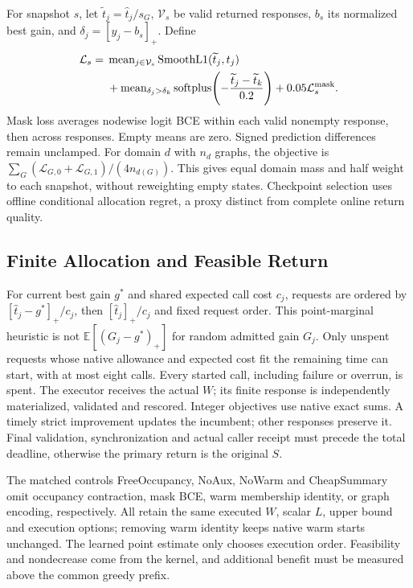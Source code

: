 For snapshot $s$, let $\widetilde t_j=\widehat t_j/s_G$,
$\mathcal V_s$ be valid returned responses,
$b_s$ its normalized best gain, and
$\delta_j=[y_j-b_s]_+$. Define
\begin{align}
 \mathcal L_s={}&\operatorname{mean}_{j\in\mathcal V_s}
    \operatorname{SmoothL1}(\widetilde t_j,t_j)\nonumber\\
 &+\operatorname{mean}_{\delta_j>\delta_k}
    \operatorname{softplus}\!\left(-\frac{\widetilde t_j-\widetilde t_k}{0.2}\right)
    +0.05\mathcal L_s^{\rm mask}.
 \label{eq:residual-loss}
\end{align}
Mask loss averages nodewise logit BCE within each valid nonempty response,
then across responses. Empty means are zero. Signed prediction differences
remain unclamped. For domain $d$ with $n_d$ graphs, the objective is
$\sum_G(\mathcal L_{G,0}+\mathcal L_{G,1})/(4n_{d(G)})$.
This gives equal domain mass and half weight to each snapshot, without
reweighting empty states. Checkpoint selection uses offline conditional
allocation regret, a proxy distinct from complete online return quality.

\subsection{Finite Allocation and Feasible Return}
For current best gain $g^*$ and shared expected call cost $c_j$, requests
are ordered by $[\widehat t_j-g^*]_+/c_j$, then $[\widehat t_j]_+/c_j$
and fixed request order. This point-marginal heuristic is not
$\mathbb E[(G_j-g^*)_+]$ for random admitted gain $G_j$. Only unspent requests whose native allowance and
expected cost fit the remaining time can start, with at most eight calls.
Every started call, including failure or overrun, is spent. The executor
receives the actual $W$; its finite response is independently materialized,
validated and rescored. Integer objectives use native exact sums. A timely
strict improvement updates the incumbent; other responses preserve it.
Final validation, synchronization and actual caller receipt must precede
the total deadline, otherwise the primary return is the original $S$.

The matched controls FreeOccupancy, NoAux, NoWarm and CheapSummary
omit occupancy contraction, mask BCE, warm membership identity, or graph
encoding, respectively. All retain the same executed $W$, scalar $L$,
upper bound and execution options; removing warm identity keeps native warm
starts unchanged. The learned point estimate only chooses execution order.
Feasibility and nondecrease come from the kernel, and additional benefit
must be measured above the common greedy prefix.
